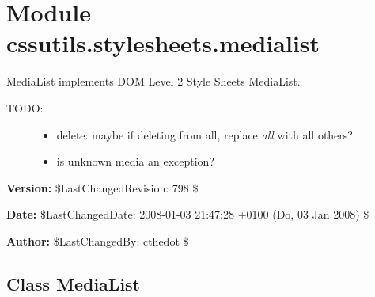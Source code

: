 %
%
%


\section{Module cssutils.stylesheets.medialist}

    \label{cssutils:stylesheets:medialist}

MediaList implements DOM Level 2 Style Sheets MediaList.
\begin{description}
\item[{TODO:}] \leavevmode \begin{itemize}
\item {} 
delete: maybe if deleting from all, replace \emph{all} with all others?

\item {} 
is unknown media an exception?

\end{itemize}

\end{description}
\textbf{Version:} \$LastChangedRevision: 798 \$



\textbf{Date:} \$LastChangedDate: 2008-01-03 21:47:28 +0100 (Do, 03 Jan 2008) \$



\textbf{Author:} \$LastChangedBy: cthedot \$





\subsection{Class MediaList}

